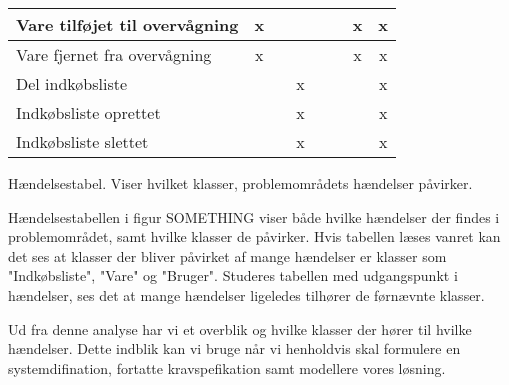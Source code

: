 \begin{table}[h]
\begin{tabular}{|l|l|c|c|c|c|c|c|c|}
\multicolumn{2}{|l|}{Vare tilføjet til overvågning} & x                           &                            &                                   &                           &                               & x                         & x                           \\ \hline
\multicolumn{2}{|l|}{Vare fjernet fra overvågning}  & x                           &                            &                                   &                           &                               & x                         & x                           \\ \hline
\multicolumn{2}{|l|}{Del indkøbsliste}              &                             &                            & x                                 &                           &                               &                           & x                           \\ \hline
\multicolumn{2}{|l|}{Indkøbsliste oprettet}         &                             &                            & x                                 &                           &                               &                           & x                           \\ \hline
\multicolumn{2}{|l|}{Indkøbsliste slettet}          &                             &                            & x                                 &                           &                               &                           & x                           \\ \hline
\end{tabular}
Hændelsestabel. Viser hvilket klasser, problemområdets hændelser påvirker.
\end{table}	

Hændelsestabellen i figur SOMETHING viser både hvilke hændelser der findes i problemområdet, samt hvilke klasser de påvirker.
Hvis tabellen læses vanret kan det ses at klasser der bliver påvirket af mange hændelser er klasser som "Indkøbsliste", "Vare" og "Bruger".
Studeres tabellen med udgangspunkt i hændelser, ses det at mange hændelser ligeledes tilhører de førnævnte klasser.



Ud fra denne analyse har vi et overblik og hvilke klasser der hører til hvilke hændelser.
Dette indblik kan vi bruge når vi henholdvis skal formulere en systemdifination, fortatte kravspefikation samt modellere vores løsning. 